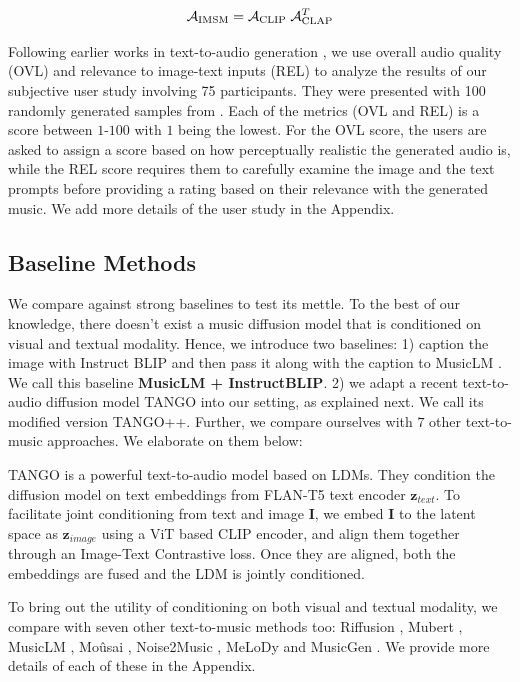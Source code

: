 \begin{equation}
\mathcal{A}_{\text{IMSM}} = \mathcal{A}_{\text{CLIP}}\;\mathcal{A}_{\text{CLAP}}^{T}
\end{equation}

Following earlier works in text-to-audio generation \cite{tango, audioldm, audiogen}, we use overall audio quality (OVL) and relevance to image-text inputs (REL) to analyze the results of our subjective user study involving 75 participants. They were presented with 100 randomly generated samples from \modelname. Each of the metrics (OVL and REL) is a score between $1$-$100$ with $1$ being the lowest. For the OVL score, the users are asked to assign a score based on how perceptually realistic the generated audio is, while the REL score requires them to carefully examine the image and the text prompts before providing a rating based on their relevance with the generated music. We add more details of the user study in the Appendix.

\subsection{Baseline Methods}

We compare \modelname against strong baselines to test its mettle. To the best of our knowledge, there doesn't exist a music diffusion model that is conditioned on visual and textual modality. Hence, we introduce two baselines: 1) caption the image with Instruct BLIP \cite{instructBLIP} and then pass it along with the caption to MusicLM \cite{musiclm}. We call this baseline \textbf{MusicLM + InstructBLIP}.  2) we adapt a recent text-to-audio diffusion model TANGO \cite{tango} into our setting, as explained next. We call its modified version TANGO++. Further, we compare ourselves with $7$ other text-to-music approaches. We elaborate on them below:

TANGO \cite{tango} is a powerful text-to-audio model based on LDMs. They condition the diffusion model on text embeddings from FLAN-T5 \cite{flant5} text encoder $\bm{z}_{text}$. To facilitate joint conditioning from text and image $\bm{I}$, we embed $\bm{I}$ to the latent space as $\bm{z}_{image}$ using a ViT \cite{vit} based CLIP encoder, and align them together through an Image-Text Contrastive loss. Once they are aligned, both the embeddings are fused and the LDM is jointly conditioned. 

To bring out the utility of conditioning on both visual and textual modality, we compare \modelname with seven other text-to-music methods too: Riffusion \cite{riffusion}, Mubert \cite{mubert}, MusicLM \cite{musiclm}, Moûsai \cite{mousai}, Noise2Music \cite{noise2music}, MeLoDy \cite{melody} and MusicGen \cite{musicgen}. We provide more details of each of these in the Appendix.


